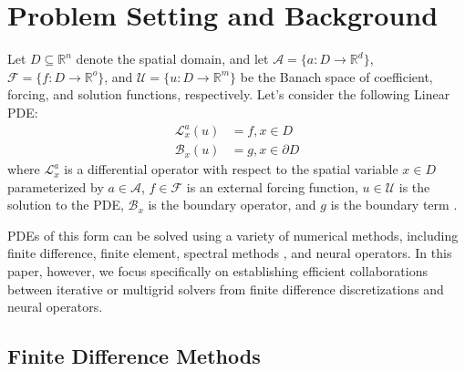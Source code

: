 \documentclass{article} %
\begin{document}
\section{Problem Setting and Background} \label{sec:background}

Let $D \subseteq \mathbb{R}^n$ denote the spatial domain, and let $\mathcal{A} = \{a: D \to \mathbb{R}^d\}$, $\mathcal{F} = \{f: D \to \mathbb{R}^o\}$, and $\mathcal{U} = \{u: D \to \mathbb{R}^m\}$ be the Banach space of coefficient, forcing, and solution functions, respectively.
Let's consider the following Linear PDE:
\begin{equation} \label{eq:mainpde}
    \begin{split}
    \mathcal{L}_{x}^a\left(u\right) &= f ,x \in D \\
    \mathcal{B}_{x}\left(u\right) &= g ,x \in \partial D
    \end{split}
\end{equation}
where $\mathcal{L}_x^a$ is a differential operator with respect to the spatial variable $x \in D$ parameterized by $a \in \mathcal{A}$,  $f \in \mathcal{F}$ is an external forcing function,  $u \in \mathcal{U}$ is the solution to the PDE, $\mathcal{B}_{x}$ is the boundary operator, and $g$ is the boundary term .  

PDEs of this form can be solved using a variety of numerical methods, including finite difference, finite element, spectral methods \citep{boyd2001chebyshev,canuto2006spectral}, and neural operators. In this paper, however, we focus specifically on establishing efficient collaborations between iterative or multigrid solvers from finite difference discretizations and neural operators.

\subsection{Finite Difference Methods} \label{sec:finitedifference}
\end{document}
